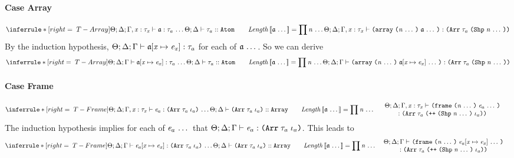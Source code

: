 \begin{sproof}
  \paragraph{Case {\sc Array}}
  \[{\infr[T-Array]
    {\sequence{\typeof{\sEnv}{\kEnv}{\tEnv, \hastype{\var}{\type_{\var}}}
        {\atom}{\type_a}}
    \\\\
    \kindof{\sEnv}{\kEnv}{\type_a}{\kindatom}
    \qquad
    \mathit{Length}\llb \sequence{\atom} \rrb = \prod{\sequence{\nat}}}
    {\typeof{\sEnv}{\kEnv}{\tEnv, \hastype{\var}{\type_{\var}}}
      {\arrlit{\sequence{\atom}}{\sequence{\nat}}}
      {\typearray{\type_a}{\idxshape{\sequence{\nat}}}}}}\]
  By the induction hypothesis,
  $\Theta;\Delta;\Gamma \vdash \mathfrak{a}\hspace{-2pt}\left[ \mathit{x} \mapsto \mathit{e}_{\mathit{x}} \right] : \mathit{\tau}_a$
  for each of $\mathfrak{a} \, \ldots \,$.
  So we can derive
  \[{\infr[T-Array]
    {\sequence{\typeof{\sEnv}{\kEnv}{\tEnv}
        {\exprsubst{\atom}}{\type_a}}
    \\\\
    \kindof{\sEnv}{\kEnv}{\type_a}{\kindatom}
    \qquad
    \mathit{Length}\llb \sequence{\atom} \rrb = \prod{\sequence{\nat}}}
    {\typeof{\sEnv}{\kEnv}{\tEnv}
      {\arrlit{\sequence{\exprsubst{\atom}}}{\sequence{\nat}}}
      {\typearray{\type_a}{\idxshape{\sequence{\nat}}}}}}\]
  \paragraph{Case {\sc Frame}}
  \[{\infr[T-Frame]
    {\sequence{\typeof{\sEnv}{\kEnv}{\tEnv, \hastype{\var}{\type_{\var}}}
        {\expr_a}{\typearray{\type_a}{\idx_a}}}
      \\\\
      {\kindof{\sEnv}{\kEnv}
        {\typearray{\type_a}{\idx_a}}
        {\kindarray}}
      \qquad
      \mathit{Length}\llb \sequence{\atom} \rrb = \prod{\sequence{\nat}}}
  {\parbox{0.6\textwidth}
    {\centering
      \({\sEnv};{\kEnv};{\tEnv, \hastype{\var}{\type_{\var}}}\vdash\)
      \({\frm{\sequence{\expr_a}}{\sequence{\nat}}}\)\\
      \(:{\typearray{\type_a}{\idxappend{\idxshape{\sequence{\nat}} \; \idx_a}}}\)}}}\]
  The induction hypothesis implies for each of $\mathit{e}_a \, \ldots \,$
  that $\typeof{\sEnv}{\kEnv}{\tEnv}{\expr_a}{\typearray{\type_a}{\idx_a}}$.
  This leads to
  \[{\infr[T-Frame]
    {\sequence{\typeof{\sEnv}{\kEnv}{\tEnv}
        {\exprsubst{\expr_a}}{\typearray{\type_a}{\idx_a}}}
      \\\\
      {\kindof{\sEnv}{\kEnv}
        {\typearray{\type_a}{\idx_a}}
        {\kindarray}}
      \qquad
      \mathit{Length}\llb \sequence{\atom} \rrb = \prod{\sequence{\nat}}}
  {\parbox{0.6\textwidth}
    {\centering
      \({\sEnv};{\kEnv};{\tEnv}\vdash\)
      \({\frm{\sequence{\exprsubst{\expr_a}}}{\sequence{\nat}}}\)\\
      \(:{\typearray{\type_a}{\idxappend{\idxshape{\sequence{\nat}} \; \idx_a}}}\)}}}\]

\end{sproof}
